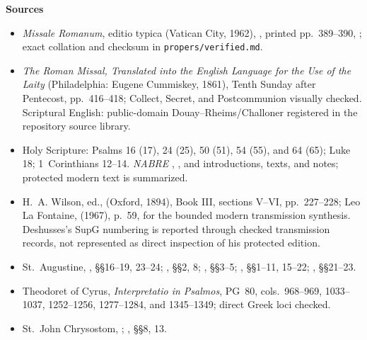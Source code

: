 \begin{deepstudy}
\textbf{Sources}
{\fontsize{7.05}{7.35}\selectfont
\begin{itemize}[itemsep=0em,topsep=0.15em,parsep=0pt]
\item \emph{Missale Romanum}, editio typica (Vatican City, 1962), , printed pp.~389--390, ; exact collation and checksum in \texttt{propers/verified.md}.
\item \emph{The Roman Missal, Translated into the English Language for the Use of the Laity} (Philadelphia: Eugene Cummiskey, 1861), Tenth Sunday after Pentecost, pp.~416--418; Collect, Secret, and Postcommunion visually checked. Scriptural English: public-domain Douay--Rheims/Challoner registered in the repository source library.
\item Holy Scripture: Psalms 16 (17), 24 (25), 50 (51), 54 (55), and 64 (65); Luke 18; 1~Corinthians 12--14. \emph{NABRE} , , and  introductions, texts, and notes; protected modern text is summarized.
\item H.~A. Wilson, ed.,  (Oxford, 1894), Book III, sections V--VI, pp.~227--228; Leo La Fontaine,  (1967), p.~59, for the bounded modern transmission synthesis. Deshusses's SupG numbering is reported through checked transmission records, not represented as direct inspection of his protected edition.
\item St.~Augustine, , §§16--19, 23--24; , §§2, 8; , §§3--5; , §§1--11, 15--22; , §§21--23.
\item Theodoret of Cyrus, \emph{Interpretatio in Psalmos}, PG~80, cols.~968--969, 1033--1037, 1252--1256, 1277--1284, and 1345--1349; direct Greek loci checked.
\item St.~John Chrysostom, ; , §§8, 13.

\end{itemize}}
\end{deepstudy}
